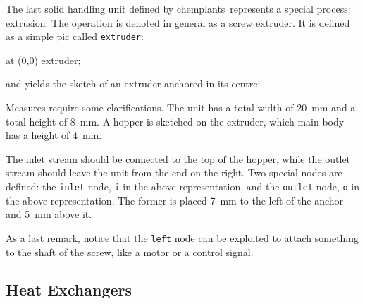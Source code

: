 \documentclass[12pt]{article}						%
\newcommand*{\chpn}[1]{\texttt{#1}}				%
\newcommand*{\chpp}[1]{\texttt{#1}}				%
\newcommand*{\chemplants}{chemplants}
\begin{document}
The last solid handling unit defined by \chemplants\ represents a special
process: extrusion. The operation is denoted in general as a screw extruder.
It is defined as a simple pic called \chpp{extruder}:
\begin{chpcode}
	\pic at (0,0) {extruder};
\end{chpcode}
and yields the sketch of an extruder anchored in its centre:
\begin{center}
\end{center}

Measures require some clarifications. The unit has a total width of \SI{20}{\mm}
and a total height of \SI{8}{\mm}. A hopper is sketched on the extruder, which
main body has a height of \SI{4}{\mm}.

The inlet stream should be connected to the top of the hopper, while the outlet
stream should leave the unit from the end on the right. Two special nodes are
defined: the \chpn{inlet} node, \chpn{i} in the above representation, and the
\chpn{outlet} node, \chpn{o} in the above representation. The former is placed
\SI{7}{\mm} to the left of the anchor and \SI{5}{\mm} above it.

As a last remark, notice that the \chpn{left} node can be exploited to attach
something to the shaft of the screw, like a motor or a control signal.

\subsection{Heat Exchangers}
\label{subsec:heahex}
\end{document}
